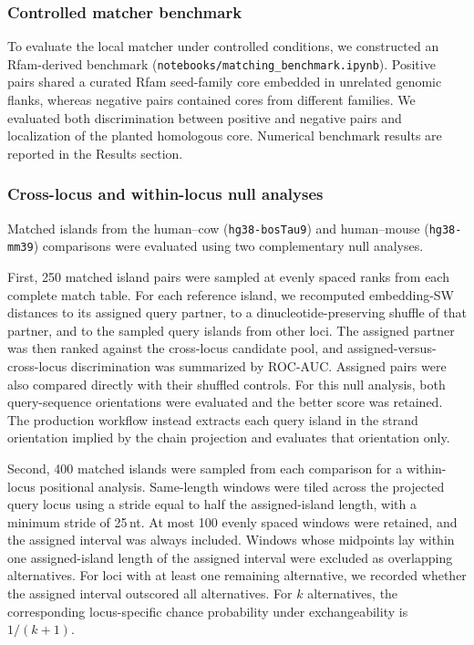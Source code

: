 \subsubsection{Controlled matcher benchmark}

To evaluate the local matcher under controlled conditions, we constructed an
Rfam-derived benchmark
(\texttt{notebooks/matching\_benchmark.ipynb}). Positive pairs shared a curated
Rfam seed-family core embedded in unrelated genomic flanks, whereas negative
pairs contained cores from different families. We evaluated both discrimination
between positive and negative pairs and localization of the planted homologous
core. Numerical benchmark results are reported in the Results section.

\subsubsection{Cross-locus and within-locus null analyses}

Matched islands from the human--cow (\texttt{hg38-bosTau9}) and human--mouse
(\texttt{hg38-mm39}) comparisons were evaluated using two complementary null
analyses.

First, 250 matched island pairs were sampled at evenly spaced ranks from each
complete match table. For each reference island, we recomputed embedding-SW
distances to its assigned query partner, to a dinucleotide-preserving shuffle of
that partner, and to the sampled query islands from other loci. The assigned
partner was then ranked against the cross-locus candidate pool, and
assigned-versus-cross-locus discrimination was summarized by ROC-AUC. Assigned
pairs were also compared directly with their shuffled controls. For this null
analysis, both query-sequence orientations were evaluated and the better score
was retained. The production workflow instead extracts each query island in the
strand orientation implied by the chain projection and evaluates that orientation
only.

Second, 400 matched islands were sampled from each comparison for a within-locus
positional analysis. Same-length windows were tiled across the projected query
locus using a stride equal to half the assigned-island length, with a minimum
stride of 25\,nt. At most 100 evenly spaced windows were retained, and the
assigned interval was always included. Windows whose midpoints lay within one
assigned-island length of the assigned interval were excluded as overlapping
alternatives. For loci with at least one remaining alternative, we recorded
whether the assigned interval outscored all alternatives. For $k$ alternatives,
the corresponding locus-specific chance probability under exchangeability is
$1/(k+1)$.

